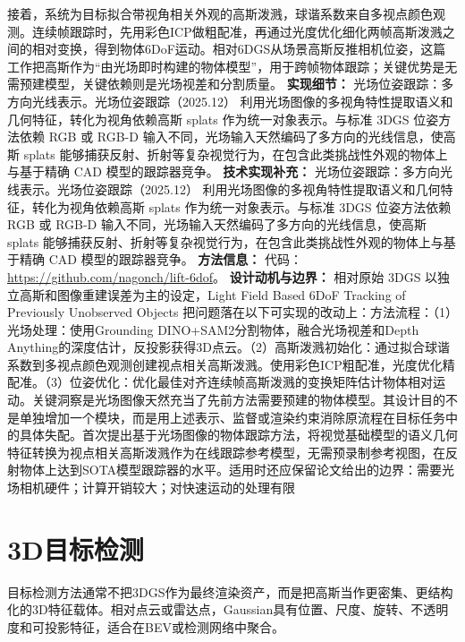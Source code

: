 接着，系统为目标拟合带视角相关外观的高斯泼溅，球谐系数来自多视点颜色观测。连续帧跟踪时，先用彩色ICP做粗配准，再通过光度优化细化两帧高斯泼溅之间的相对变换，得到物体6DoF运动。相对6DGS从场景高斯反推相机位姿，这篇工作把高斯作为“由光场即时构建的物体模型”，用于跨帧物体跟踪；关键优势是无需预建模型，关键依赖则是光场视差和分割质量。
\textbf{实现细节：} 光场位姿跟踪：多方向光线表示。光场位姿跟踪（2025.12） 利用光场图像的多视角特性提取语义和几何特征，转化为视角依赖高斯 splats 作为统一对象表示。与标准 3DGS 位姿方法依赖 RGB 或 RGB-D 输入不同，光场输入天然编码了多方向的光线信息，使高斯 splats 能够捕获反射、折射等复杂视觉行为，在包含此类挑战性外观的物体上与基于精确 CAD 模型的跟踪器竞争。
\textbf{技术实现补充：} 光场位姿跟踪：多方向光线表示。光场位姿跟踪（2025.12） 利用光场图像的多视角特性提取语义和几何特征，转化为视角依赖高斯 splats 作为统一对象表示。与标准 3DGS 位姿方法依赖 RGB 或 RGB-D 输入不同，光场输入天然编码了多方向的光线信息，使高斯 splats 能够捕获反射、折射等复杂视觉行为，在包含此类挑战性外观的物体上与基于精确 CAD 模型的跟踪器竞争。
\textbf{方法信息：} 代码：\url{https://github.com/nagonch/lift-6dof}。
\textbf{设计动机与边界：} 相对原始 3DGS 以独立高斯和图像重建误差为主的设定，Light Field Based 6DoF Tracking of Previously Unobserved Objects 把问题落在以下可实现的改动上：方法流程：（1）光场处理：使用Grounding DINO+SAM2分割物体，融合光场视差和Depth Anything的深度估计，反投影获得3D点云。（2）高斯泼溅初始化：通过拟合球谐系数到多视点颜色观测创建视点相关高斯泼溅。使用彩色ICP粗配准，光度优化精配准。（3）位姿优化：优化最佳对齐连续帧高斯泼溅的变换矩阵估计物体相对运动。关键洞察是光场图像天然充当了先前方法需要预建的物体模型。其设计目的不是单独增加一个模块，而是用上述表示、监督或渲染约束消除原流程在目标任务中的具体失配。首次提出基于光场图像的物体跟踪方法，将视觉基础模型的语义几何特征转换为视点相关高斯泼溅作为在线跟踪参考模型，无需预录制参考视图，在反射物体上达到SOTA模型跟踪器的水平。适用时还应保留论文给出的边界：需要光场相机硬件；计算开销较大；对快速运动的处理有限

\section{3D目标检测}

目标检测方法通常不把3DGS作为最终渲染资产，而是把高斯当作更密集、更结构化的3D特征载体。相对点云或雷达点，Gaussian具有位置、尺度、旋转、不透明度和可投影特征，适合在BEV或检测网络中聚合。
